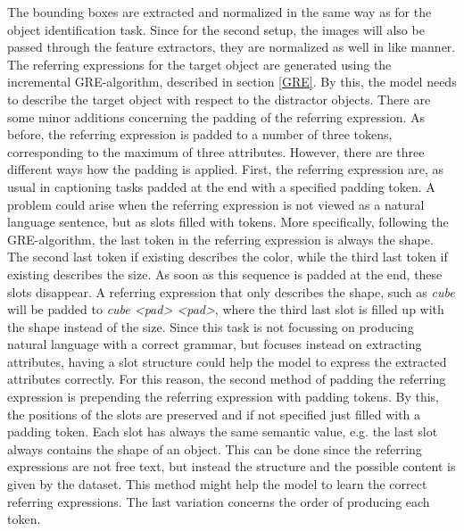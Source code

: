 The bounding boxes are extracted and normalized in the same way as for the object identification task.
Since for the second setup, the images will also be passed through the feature extractors, they are normalized as well in like manner.
The referring expressions for the target object are generated using the incremental GRE-algorithm, described in section \ref{GRE}.
By this, the model needs to describe the target object with respect to the distractor objects.
There are some minor additions concerning the padding of the referring expression.
As before, the referring expression is padded to a number of three tokens, corresponding to the maximum of three attributes.
However, there are three different ways how the padding is applied.
First, the referring expression are, as usual in captioning tasks padded at the end with a specified padding token.
A problem could arise when the referring expression is not viewed as a natural language sentence, but as slots filled with tokens.
More specifically, following the GRE-algorithm, the last token in the referring expression is always the shape.
The second last token if existing describes the color, while the third last token if existing describes the size.
As soon as this sequence is padded at the end, these slots disappear.
A referring expression that only describes the shape, such as \emph{cube} will be padded to \emph{cube <pad> <pad>}, where the third last slot is filled up with the shape instead of the size.
Since this task is not focussing on producing natural language with a correct grammar, but focuses instead on extracting attributes, having a slot structure could help the model to express the extracted attributes correctly.
For this reason, the second method of padding the referring expression is prepending the referring expression with padding tokens.
By this, the positions of the slots are preserved and if not specified just filled with a padding token.
Each slot has always the same semantic value, e.g. the last slot always contains the shape of an object.
This can be done since the referring expressions are not free text, but instead the structure and the possible content is given by the dataset.
This method might help the model to learn the correct referring expressions.
The last variation concerns the order of producing each token.
